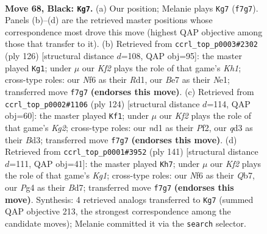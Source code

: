 \documentclass[11pt]{article}
\begin{document}
\clearpage

\begin{figure}[p]\centering
\begin{subfigure}{0.46\textwidth}\centering
\resizebox{\linewidth}{!}{%
\newchessgame
\chessboard[
  setfen={5r2/3qbk2/5n2/P1p2p1p/3p1Pp1/3Q3P/1R1BPK2/3N4 b - - 0 68},
  showmover=false,
  pgfstyle=straightmove, color=movearrow, markmove={f7-g7}
]}
\caption{}
\end{subfigure}\hfill
\begin{subfigure}{0.46\textwidth}\centering
\resizebox{\linewidth}{!}{%
\newchessgame
\chessboard[
  setfen={8/1pr2k2/5p1p/3q1bpP/1p1P4/1P3P2/P3Q1P1/3RN2K w - - 5 64},
  showmover=false,
  pgfstyle=straightmove, color=movearrow, markmove={h1-g1}
]}
\caption{}
\end{subfigure}
\\[4pt]
\begin{subfigure}{0.46\textwidth}\centering
\resizebox{\linewidth}{!}{%
\newchessgame
\chessboard[
  setfen={8/5pk1/2q1nbp1/2Pp3p/7P/3BPNP1/2Q2PK1/8 w - - 1 63},
  showmover=false,
  pgfstyle=straightmove, color=movearrow, markmove={g2-f1}
]}
\caption{}
\end{subfigure}\hfill
\begin{subfigure}{0.46\textwidth}\centering
\resizebox{\linewidth}{!}{%
\newchessgame
\chessboard[
  setfen={r5k1/1q1bbp2/1p1pp1n1/1P4pN/4P2p/5P1P/3Q2P1/2R2BBK b - - 1 71},
  showmover=false,
  pgfstyle=straightmove, color=movearrow, markmove={g8-h7}
]}
\caption{}
\end{subfigure}
\caption{\textbf{Move 68, Black: \texttt{Kg7}.} (a) Our position; Melanie plays \texttt{Kg7} (\texttt{f7g7}). Panels (b)--(d) are the retrieved master positions whose correspondence most drove this move (highest QAP objective among those that transfer to it). (b) Retrieved from \texttt{ccrl\_top\_p0003\#2302} (ply 126) [structural distance $d$=108, QAP obj=95]: the master played \texttt{Kg1}; under $\mu$ our \emph{Kf2} plays the role of that game's \emph{Kh1}; cross-type roles: our \emph{N}f6 as their \emph{R}d1, our \emph{B}e7 as their \emph{N}e1; transferred move \texttt{f7g7} \textbf{(endorses this move)}. (c) Retrieved from \texttt{ccrl\_top\_p0002\#1106} (ply 124) [structural distance $d$=114, QAP obj=60]: the master played \texttt{Kf1}; under $\mu$ our \emph{Kf2} plays the role of that game's \emph{Kg2}; cross-type roles: our \emph{n}d1 as their \emph{P}f2, our \emph{q}d3 as their \emph{B}d3; transferred move \texttt{f7g7} \textbf{(endorses this move)}. (d) Retrieved from \texttt{ccrl\_top\_p0001\#3952} (ply 141) [structural distance $d$=111, QAP obj=41]: the master played \texttt{Kh7}; under $\mu$ our \emph{Kf2} plays the role of that game's \emph{Kg1}; cross-type roles: our \emph{N}f6 as their \emph{Q}b7, our \emph{P}g4 as their \emph{B}d7; transferred move \texttt{f7g7} \textbf{(endorses this move)}. Synthesis: 4 retrieved analogs transferred to \texttt{Kg7} (summed QAP objective 213, the strongest correspondence among the candidate moves); Melanie committed it via the \texttt{search} selector.}
\label{fig:thought-m135}
\end{figure}
\end{document}
